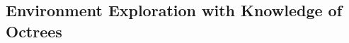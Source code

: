             
            
            
            
            
    
            
            
    
    

    \subsection{Environment Exploration with Knowledge of Octrees}
        
